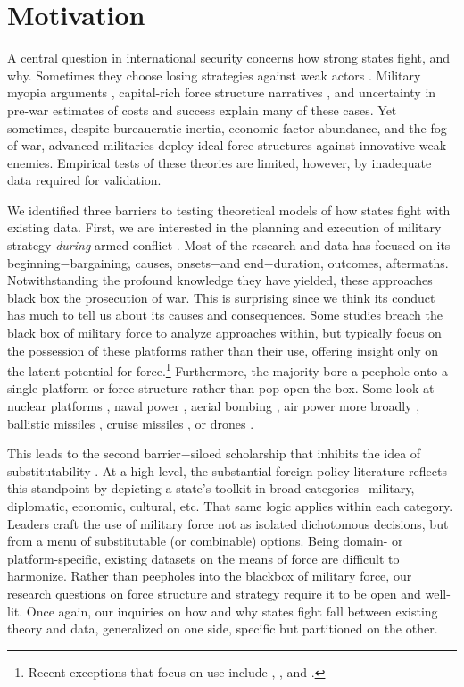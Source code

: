 \documentclass[fleqn,12pt]{article}
\begin{document}
\section*{Motivation}
A central question in international security concerns how strong states fight, and why. Sometimes they choose losing strategies against weak actors \citep{Arreguin01}. Military myopia arguments \citep{Gentry02, LyallWilson09}, capital-rich force structure narratives \citep{Gartzke01, Caverley09}, and uncertainty in pre-war estimates of costs and success \citep{Sullivan07} explain many of these cases. Yet sometimes, despite bureaucratic inertia, economic factor abundance, and the fog of war, advanced militaries deploy ideal force structures against innovative weak enemies. Empirical tests of these theories are limited, however, by inadequate data required for validation. 

We identified three barriers to testing theoretical models of how states fight with existing data. First, we are interested in the planning and execution of military strategy \textit{during} armed conflict \citep{Wallace08}. Most of the research and data has focused on its beginning$-$bargaining, causes, onsets$-$and end$-$duration, outcomes, aftermaths. Notwithstanding the profound knowledge they have yielded, these approaches black box the prosecution of war. This is surprising since we think its conduct has much to tell us about its causes and consequences. Some studies breach the black box of military force to analyze approaches within, but typically focus on the possession of these platforms rather than their use, offering insight only on the latent potential for force.\footnote{Recent exceptions that focus on use include \citet{MM15}, \citet{Post19}, and \citet{Gannon22}.} Furthermore, the majority bore a peephole onto a single platform or force structure rather than pop open the box. Some look at nuclear platforms \citep{Gartzke14}, naval power \citep{CrisherSouva14}, aerial bombing \citep{Pape96}, air power more broadly \citep{HorowitzReiter01, MM15, AllenMM17}, ballistic missiles \citep{ReiterMettler13}, cruise missiles \citep{Early22}, or drones \citep{FuhrmannHorowitz17}.

This leads to the second barrier$-$siloed scholarship that inhibits the idea of substitutability \citep{MorganPalmer00}. At a high level, the substantial foreign policy literature reflects this standpoint by depicting a state's toolkit in broad categories$-$military, diplomatic, economic, cultural, etc. That same logic applies within each category. Leaders craft the use of military force not as isolated dichotomous decisions, but from a menu of substitutable (or combinable) options. Being domain- or platform-specific, existing datasets on the means of force are difficult to harmonize. Rather than peepholes into the blackbox of military force, our research questions on force structure and strategy require it to be open and well-lit. Once again, our inquiries on how and why states fight fall between existing theory and data, generalized on one side, specific but partitioned on the other.
\end{document}

